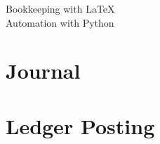 


	\begin{center}
		{\Huge Bookkeeping with \LaTeX}\\[5pt]{\LARGE Automation with Python}
	\end{center}
	\section{Journal}
	
	\section{Ledger Posting}
	
